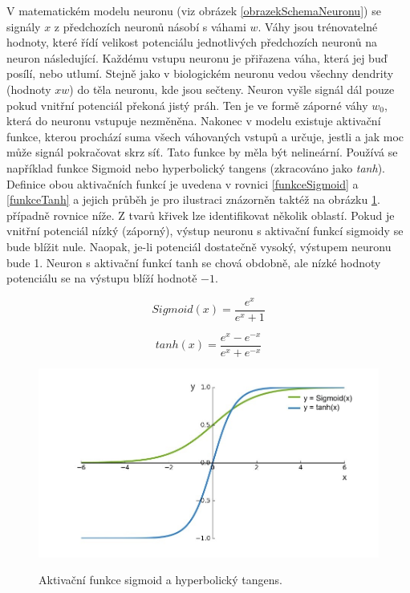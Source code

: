 V matematickém modelu neuronu (viz obrázek \ref{obrazekSchemaNeuronu}) 
se signály $ x $ z předchozích neuronů
násobí s váhami $ w $.
Váhy jsou trénovatelné hodnoty, 
které řídí velikost potenciálu
jednotlivých předchozích neuronů na neuron následující. 
Každému vstupu neuronu je přiřazena váha, 
která jej buď posílí, nebo utlumí.
Stejně jako v biologickém neuronu vedou všechny dendrity (hodnoty $ xw $)
do těla neuronu, kde jsou sečteny.
Neuron vyšle signál dál pouze pokud vnitřní potenciál překoná jistý práh.
Ten je ve formě záporné váhy $ w_0 $, 
která do neuronu vstupuje nezměněna.
Nakonec v modelu existuje aktivační funkce,
kterou prochází suma všech váhovaných vstupů a
určuje, jestli a jak moc může signál pokračovat skrz síť.
Tato funkce by měla být nelineární.
Používá se například funkce Sigmoid nebo hyperbolický tangens 
(zkracováno jako \emph{tanh}).
Definice obou aktivačních funkcí je uvedena v rovnici
\ref{funkceSigmoid} a \ref{funkceTanh} 
a jejich průběh je pro ilustraci znázorněn taktéž na obrázku 
\ref{obrazekAktivačníFunkce}.
případně rovnice níže.
Z tvarů křivek lze identifikovat několik oblastí.
Pokud je vnitřní potenciál nízký (záporný), 
výstup neuronu s aktivační funkcí sigmoidy se bude blížit nule.
Naopak, je-li potenciál dostatečně vysoký, výstupem neuronu bude 1.
Neuron s aktivační funkcí tanh se chová obdobně,
ale nízké hodnoty potenciálu se na výstupu blíží hodnotě $ -1 $.

\begin{equation}\label{funkceSigmoid}
     Sigmoid(x) = \frac{e^x}{e^x + 1}
\end{equation}

\begin{equation}\label{funkceTanh}
    tanh(x) = \frac{e^x - e^{-x}}{e^x + e^{-x}}
\end{equation}

\begin{figure}[h]\centering
    \centering
    \includegraphics[width=0.8\linewidth]{obrazky/novyTanhASigmoid.png}\\[1pt]  
    \caption{Aktivační funkce sigmoid a hyperbolický tangens.}    
    \label{obrazekAktivačníFunkce}
\end{figure}

